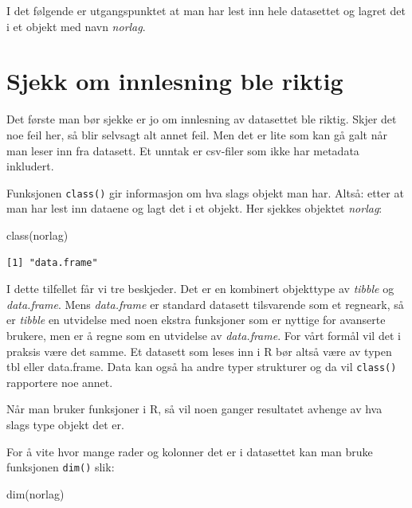 \documentclass[
  letterpaper,
  DIV=11,
  numbers=noendperiod]{scrreprt}
\newenvironment{Shaded}{\begin{snugshade}}{\end{snugshade}}
\newcommand{\FunctionTok}[1]{\textcolor[rgb]{0.28,0.35,0.67}{#1}}
\newcommand{\NormalTok}[1]{\textcolor[rgb]{0.00,0.23,0.31}{#1}}
\theoremstyle{definition}
\theoremstyle{remark}
\begin{document}
I det følgende er utgangspunktet at man har lest inn hele datasettet og
lagret det i et objekt med navn \emph{norlag}.

\hypertarget{sjekk-om-innlesning-ble-riktig}{%
\section{Sjekk om innlesning ble
riktig}\label{sjekk-om-innlesning-ble-riktig}}

Det første man bør sjekke er jo om innlesning av datasettet ble riktig.
Skjer det noe feil her, så blir selvsagt alt annet feil. Men det er lite
som kan gå galt når man leser inn fra datasett. Et unntak er csv-filer
som ikke har metadata inkludert.

Funksjonen \texttt{class()} gir informasjon om hva slags objekt man har.
Altså: etter at man har lest inn dataene og lagt det i et objekt. Her
sjekkes objektet \emph{norlag}:

\begin{Shaded}
\begin{Highlighting}[]
\FunctionTok{class}\NormalTok{(norlag)}
\end{Highlighting}
\end{Shaded}

\begin{verbatim}
[1] "data.frame"
\end{verbatim}

I dette tilfellet får vi tre beskjeder. Det er en kombinert objekttype
av \emph{tibble} og \emph{data.frame}. Mens \emph{data.frame} er
standard datasett tilsvarende som et regneark, så er \emph{tibble} en
utvidelse med noen ekstra funksjoner som er nyttige for avanserte
brukere, men er å regne som en utvidelse av \emph{data.frame}. For vårt
formål vil det i praksis være det samme. Et datasett som leses inn i R
bør altså være av typen tbl eller data.frame. Data kan også ha andre
typer strukturer og da vil \texttt{class()} rapportere noe annet.

Når man bruker funksjoner i R, så vil noen ganger resultatet avhenge av
hva slags type objekt det er.

For å vite hvor mange rader og kolonner det er i datasettet kan man
bruke funksjonen \texttt{dim()} slik:

\begin{Shaded}
\begin{Highlighting}[]
\FunctionTok{dim}\NormalTok{(norlag)}
\end{Highlighting}
\end{Shaded}
\end{document}
